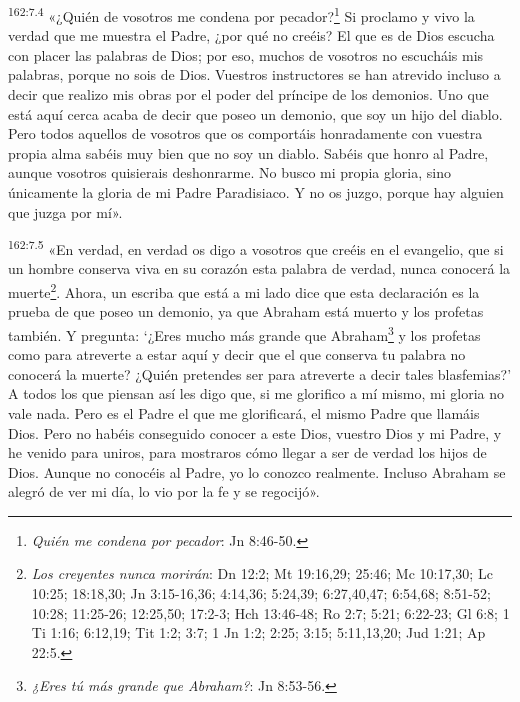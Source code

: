 \par 
\textsuperscript{162:7.4} «¿Quién de vosotros me condena por pecador?\footnote{\textit{Quién me condena por pecador}: Jn 8:46-50.} Si proclamo y vivo la verdad que me muestra el Padre, ¿por qué no creéis? El que es de Dios escucha con placer las palabras de Dios; por eso, muchos de vosotros no escucháis mis palabras, porque no sois de Dios. Vuestros instructores se han atrevido incluso a decir que realizo mis obras por el poder del príncipe de los demonios. Uno que está aquí cerca acaba de decir que poseo un demonio, que soy un hijo del diablo. Pero todos aquellos de vosotros que os comportáis honradamente con vuestra propia alma sabéis muy bien que no soy un diablo. Sabéis que honro al Padre, aunque vosotros quisierais deshonrarme. No busco mi propia gloria, sino únicamente la gloria de mi Padre Paradisiaco. Y no os juzgo, porque hay alguien que juzga por mí».

\par 
\textsuperscript{162:7.5} «En verdad, en verdad os digo a vosotros que creéis en el evangelio, que si un hombre conserva viva en su corazón esta palabra de verdad, nunca conocerá la muerte\footnote{\textit{Los creyentes nunca morirán}: Dn 12:2; Mt 19:16,29; 25:46; Mc 10:17,30; Lc 10:25; 18:18,30; Jn 3:15-16,36; 4:14,36; 5:24,39; 6:27,40,47; 6:54,68; 8:51-52; 10:28; 11:25-26; 12:25,50; 17:2-3; Hch 13:46-48; Ro 2:7; 5:21; 6:22-23; Gl 6:8; 1 Ti 1:16; 6:12,19; Tit 1:2; 3:7; 1 Jn 1:2; 2:25; 3:15; 5:11,13,20; Jud 1:21; Ap 22:5.}. Ahora, un escriba que está a mi lado dice que esta declaración es la prueba de que poseo un demonio, ya que Abraham está muerto y los profetas también. Y pregunta: `¿Eres mucho más grande que Abraham\footnote{\textit{¿Eres tú más grande que Abraham?}: Jn 8:53-56.} y los profetas como para atreverte a estar aquí y decir que el que conserva tu palabra no conocerá la muerte? ¿Quién pretendes ser para atreverte a decir tales blasfemias?' A todos los que piensan así les digo que, si me glorifico a mí mismo, mi gloria no vale nada. Pero es el Padre el que me glorificará, el mismo Padre que llamáis Dios. Pero no habéis conseguido conocer a este Dios, vuestro Dios y mi Padre, y he venido para uniros, para mostraros cómo llegar a ser de verdad los hijos de Dios. Aunque no conocéis al Padre, yo lo conozco realmente. Incluso Abraham se alegró de ver mi día, lo vio por la fe y se regocijó».

